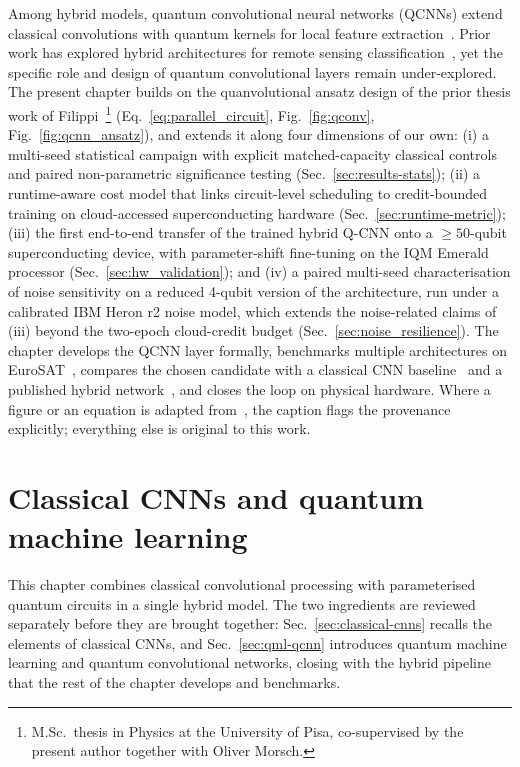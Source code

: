Among hybrid models, quantum convolutional neural networks (QCNNs) extend classical convolutions
with quantum kernels for local feature extraction~\cite{Cong2019}. Prior work has explored hybrid
architectures for remote sensing classification~\cite{Sebastianelli2021}, yet the specific role and
design of quantum convolutional layers remain under-explored. The present chapter builds on the quanvolutional ansatz design of the prior thesis work of Filippi~\cite{Filippi2025Thesis}\footnote{M.Sc.\ thesis in Physics at the University of Pisa, co-supervised by the present author together with Oliver Morsch.} (Eq.~\ref{eq:parallel_circuit}, Fig.~\ref{fig:qconv}, Fig.~\ref{fig:qcnn_ansatz}), and extends it along four dimensions of our own: (i) a multi-seed statistical campaign with explicit matched-capacity classical controls and paired non-parametric significance testing (Sec.~\ref{sec:results-stats}); (ii) a runtime-aware cost model that links circuit-level scheduling to credit-bounded training on cloud-accessed superconducting hardware (Sec.~\ref{sec:runtime-metric}); (iii) the first end-to-end transfer of the trained hybrid Q-CNN onto a $\geq 50$-qubit superconducting device, with parameter-shift fine-tuning on the IQM Emerald processor (Sec.~\ref{sec:hw_validation}); and (iv) a paired multi-seed characterisation of noise sensitivity on a reduced 4-qubit version of the architecture, run under a calibrated IBM Heron r2 noise model, which extends the noise-related claims of (iii) beyond the two-epoch cloud-credit budget (Sec.~\ref{sec:noise_resilience}). The chapter develops the QCNN layer formally, benchmarks multiple architectures on EuroSAT~\cite{Helber2019}, compares the chosen candidate with a classical CNN baseline~\cite{LeCun1998} and a published hybrid network~\cite{Sebastianelli2021}, and closes the loop on physical hardware. Where a figure or an equation is adapted from~\cite{Filippi2025Thesis}, the caption flags the provenance explicitly; everything else is original to this work.

\section{Classical CNNs and quantum machine learning}
This chapter combines classical convolutional processing with parameterised quantum circuits in a single hybrid model. The two ingredients are reviewed separately before they are brought together: Sec.~\ref{sec:classical-cnns} recalls the elements of classical CNNs, and Sec.~\ref{sec:qml-qcnn} introduces quantum machine learning and quantum convolutional networks, closing with the hybrid pipeline that the rest of the chapter develops and benchmarks.


